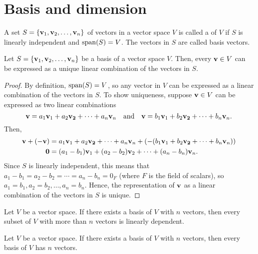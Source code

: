\section{Basis and dimension}

\begin{definition}
A set $ S=\{\mathbf{v}_1,\mathbf{v}_2,\ldots,\mathbf{v}_n\} $ of vectors in a vector space $ V $ is called a  of $ V $ if $ S $ is linearly independent and $ \operatorname{span}(S)=V $. The vectors in $ S $ are called basis vectors.
\end{definition}

\begin{theorem}
Let $ S=\{\mathbf{v}_1,\mathbf{v}_2,\ldots,\mathbf{v}_n\} $ be a basis of a vector space $ V $. Then, every $ \mathbf{v}\in V $ can be expressed as a unique linear combination of the vectors in $ S $.
\end{theorem}
\begin{proof}
By definition, $ \operatorname{span}(S)=V $, so any vector in $ V $ can be expressed as a linear combination of the vectors in $ S $. To show uniqueness, suppose $ \mathbf{v}\in V $ can be expressed as two linear combinations
\begin{equation*}
    \mathbf{v}=a_1\mathbf{v}_1+a_2\mathbf{v_2}+\cdots+a_n\mathbf{v}_n \quad\text{and}\quad \mathbf{v}=b_1\mathbf{v}_1+b_2\mathbf{v_2}+\cdots+b_n\mathbf{v}_n.
\end{equation*}
Then,
\begin{align*}
    \mathbf{v}+(-\mathbf{v}) &= a_1\mathbf{v}_1+a_2\mathbf{v_2}+\cdots+a_n\mathbf{v}_n+(-(b_1\mathbf{v}_1+b_2\mathbf{v_2}+\cdots+b_n\mathbf{v}_n)) \\
    \mathbf{0} &= (a_1-b_1)\mathbf{v}_1+(a_2-b_2)\mathbf{v}_2+\cdots+(a_n-b_n)\mathbf{v}_n.
\end{align*}
Since $ S $ is linearly independent, this means that $ a_1-b_1=a_2-b_2=\cdots=a_n-b_n=0_F $ (where $ F $ is the field of scalars), so $ a_1=b_1,a_2=b_2,\ldots,a_n=b_n $. Hence, the representation of $ \mathbf{v} $ as a linear combination of the vectors in $ S $ is unique.
\end{proof}

\begin{theorem}
Let $ V $ be a vector space. If there exists a basis of $ V $ with $ n $ vectors, then every subset of $ V $ with more than $ n $ vectors is linearly dependent.
\end{theorem}

\begin{corollary}
Let $ V $ be a vector space. If there exists a basis of $ V $ with $ n $ vectors, then every basis of $ V $ has $ n $ vectors.
\end{corollary}

